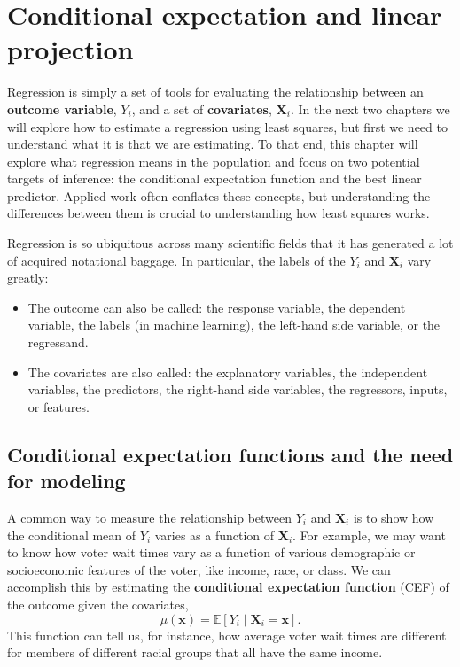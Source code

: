 \documentclass[
  13pt,
  letterpaper,
  DIV=11,
  numbers=noendperiod]{scrreprt}
\providecommand{\tightlist}{%
  \setlength{\itemsep}{0pt}\setlength{\parskip}{0pt}}
\newcommand{\mb}{\bm}
\newcommand{\E}{\mathbb{E}}
\newcommand{\X}{\mb{X}}
\newcommand{\bfx}{\mb{x}}
\theoremstyle{plain}
\theoremstyle{plain}
\theoremstyle{definition}
\theoremstyle{definition}
\theoremstyle{remark}
\begin{document}
\chapter{Conditional expectation and linear
projection}\label{sec-regression}

Regression is simply a set of tools for evaluating the relationship
between an \textbf{outcome variable}, \(Y_i\), and a set of
\textbf{covariates}, \(\X_i\). In the next two chapters we will explore
how to estimate a regression using least squares, but first we need to
understand what it is that we are estimating. To that end, this chapter
will explore what regression means in the population and focus on two
potential targets of inference: the conditional expectation function and
the best linear predictor. Applied work often conflates these concepts,
but understanding the differences between them is crucial to
understanding how least squares works.

Regression is so ubiquitous across many scientific fields that it has
generated a lot of acquired notational baggage. In particular, the
labels of the \(Y_i\) and \(\X_i\) vary greatly:

\begin{itemize}
\tightlist
\item
  The outcome can also be called: the response variable, the dependent
  variable, the labels (in machine learning), the left-hand side
  variable, or the regressand.
\item
  The covariates are also called: the explanatory variables, the
  independent variables, the predictors, the right-hand side variables,
  the regressors, inputs, or features.
\end{itemize}

\section{Conditional expectation functions and the need for
modeling}\label{conditional-expectation-functions-and-the-need-for-modeling}

A common way to measure the relationship between \(Y_i\) and \(\X_i\) is
to show how the conditional mean of \(Y_i\) varies as a function of
\(\X_i\). For example, we may want to know how voter wait times vary as
a function of various demographic or socioeconomic features of the
voter, like income, race, or class. We can accomplish this by estimating
the \textbf{conditional expectation function} (CEF) of the outcome given
the covariates, \[
\mu(\bfx) = \E[Y_i \mid \X_i = \bfx].
\] This function can tell us, for instance, how average voter wait times
are different for members of different racial groups that all have the
same income.
\end{document}

